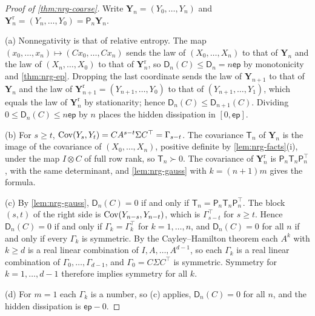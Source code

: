 \begin{proof}[Proof of \cref{thm:nrg-coarse}]
Write $\mathbf Y_n=(Y_0,\dots,Y_n)$ and $\mathbf Y_n^{\mathrm r}=(Y_n,\dots,Y_0)=\mathsf P_n\mathbf Y_n$.

(a) Nonnegativity is that of relative entropy. The map $(x_0,\dots,x_n)\mapsto(Cx_0,\dots,Cx_n)$ sends the law of $(X_0,\dots,X_n)$ to that of $\mathbf Y_n$ and the law of $(X_n,\dots,X_0)$ to that of $\mathbf Y_n^{\mathrm r}$, so $\mathsf D_n(C)\le\mathsf D_n=n\mathsf{ep}$ by monotonicity and \cref{thm:nrg-ep}. Dropping the last coordinate sends the law of $\mathbf Y_{n+1}$ to that of $\mathbf Y_n$ and the law of $\mathbf Y_{n+1}^{\mathrm r}=(Y_{n+1},\dots,Y_0)$ to that of $(Y_{n+1},\dots,Y_1)$, which equals the law of $\mathbf Y_n^{\mathrm r}$ by stationarity; hence $\mathsf D_n(C)\le\mathsf D_{n+1}(C)$. Dividing $0\le\mathsf D_n(C)\le n\mathsf{ep}$ by $n$ places the hidden dissipation in $[0,\mathsf{ep}]$.

(b) For $s\ge t$, $\operatorname{Cov}(Y_s,Y_t)=CA^{s-t}\Sigma C^\top=\Gamma_{s-t}$. The covariance $\mathsf T_n$ of $\mathbf Y_n$ is the image of the covariance of $(X_0,\dots,X_n)$, positive definite by \cref{lem:nrg-facts}(i), under the map $I\otimes C$ of full row rank, so $\mathsf T_n\succ0$. The covariance of $\mathbf Y_n^{\mathrm r}$ is $\mathsf P_n\mathsf T_n\mathsf P_n^\top$, with the same determinant, and \cref{lem:nrg-gauss} with $k=(n+1)m$ gives the formula.

(c) By \cref{lem:nrg-gauss}, $\mathsf D_n(C)=0$ if and only if $\mathsf T_n=\mathsf P_n\mathsf T_n\mathsf P_n^\top$. The block $(s,t)$ of the right side is $\operatorname{Cov}(Y_{n-s},Y_{n-t})$, which is $\Gamma_{s-t}^\top$ for $s\ge t$. Hence $\mathsf D_n(C)=0$ if and only if $\Gamma_k=\Gamma_k^\top$ for $k=1,\dots,n$, and $\mathsf D_n(C)=0$ for all $n$ if and only if every $\Gamma_k$ is symmetric. By the Cayley--Hamilton theorem each $A^k$ with $k\ge d$ is a real linear combination of $I,A,\dots,A^{d-1}$, so each $\Gamma_k$ is a real linear combination of $\Gamma_0,\dots,\Gamma_{d-1}$, and $\Gamma_0=C\Sigma C^\top$ is symmetric. Symmetry for $k=1,\dots,d-1$ therefore implies symmetry for all $k$.

(d) For $m=1$ each $\Gamma_k$ is a number, so (c) applies, $\mathsf D_n(C)=0$ for all $n$, and the hidden dissipation is $\mathsf{ep}-0$.
\end{proof}

